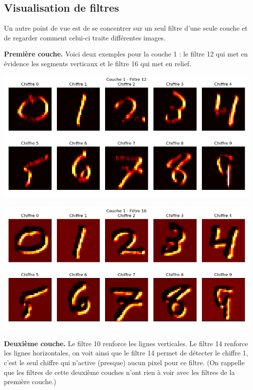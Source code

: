 \documentclass[11pt,class=report,crop=false]{standalone}
\begin{document}
\subsection{Visualisation de filtres}

Un autre point de vue est de se concentrer sur un seul filtre d'une seule couche et de regarder comment celui-ci traite différentes images.


\textbf{Première couche.}
Voici deux exemples pour la couche 1 : le filtre 12 qui met en évidence les segments verticaux et le filtre 16 qui met en relief.
\begin{center}
\includegraphics[scale=\myscale,scale=0.5]{figures/tfconv-viz3-c1-f12}
\end{center}

\begin{center}
\includegraphics[scale=\myscale,scale=0.5]{figures/tfconv-viz3-c1-f16}
\end{center}

\bigskip
\textbf{Deuxième couche.}
Le filtre 10 renforce les lignes verticales. Le filtre 14 renforce les lignes horizontales, on voit ainsi que le filtre 14 permet de détecter le chiffre 1, c'est le seul chiffre qui n'active (presque) aucun pixel pour ce filtre. (On rappelle que les filtres de cette deuxième couches n'ont rien à voir avec les filtres de la première couche.)
\end{document}
